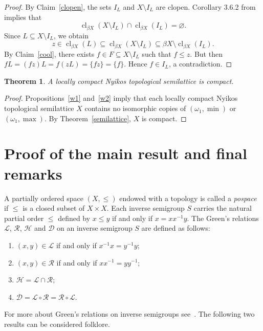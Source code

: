 \documentclass[12pt, twoside, leqno]{article}
\newtheorem{theorem}{Theorem}[section]
\theoremstyle{definition}
\numberwithin{equation}{section}
\newcommand{\w}{\omega}
\newcommand{\cl}{\operatorname{cl}}
\begin{document}
\begin{proof}
 
By Claim~\ref{clopen}, the sets $I_L$ and $X\setminus I_L$ are clopen. Corollary 3.6.2 from \cite{Eng} implies that $$\cl_{\beta X}(X\setminus I_L)\cap \cl_{\beta X}(I_L)=\varnothing.$$
Since $L\subseteq X\setminus I_L$, we obtain $$z\in \cl_{\beta X}(L)\subseteq  \cl_{\beta X}(X\setminus I_L)\subseteq \beta X\setminus \cl_{\beta X}(I_L).$$    
By Claim~\ref{cool}, there exists $f\in F\subseteq X\setminus I_L$ such that $f\leq z$. But then $fL=(fz)L=f(zL)=\{fz\}=\{f\}$. Hence $f\in I_L$, a contradiction. 
\end{proof}






\begin{theorem}\label{Nyikossemilattice}
A locally compact Nyikos topological semilattice is compact.    
\end{theorem}

\begin{proof}
Propositions~\ref{w1} and~\ref{w2} imply that each locally compact Nyikos topological semilattice $X$ contains no isomorphic copies of $(\w_1,\min)$ or $(\omega_1,\max)$. By Theorem~\ref{semilattice}, $X$ is compact.   
\end{proof}

\section{Proof of the main result and final remarks}\label{proof of the main result}


A partially ordered space $(X,\leq)$ endowed with a topology is called a {\em pospace} if $\leq$ is a closed subset of $X{\times}X$.
Each inverse semigroup $S$ carries the natural partial order $\leq$ defined by $x\leq y$ if and only if $x=xx^{-1}y$. 
 The Green's relations $\mathcal L$, $\mathcal R$, $\mathcal H$ and $\mathcal D$ on an inverse semigroup $S$ are defined as follows:

\begin{enumerate}[label=(\roman*)]
    \item $(x,y)\in\mathcal L$ if and only if $x^{-1}x=y^{-1}y$;
    \item $(x,y)\in\mathcal R$ if and only if $xx^{-1}=yy^{-1}$;
    \item $\mathcal H=\mathcal L\cap\mathcal R$;
    \item $\mathcal D=\mathcal L\circ\mathcal R=\mathcal R\circ\mathcal L$.
\end{enumerate}
For more about Green's relations on inverse semigroups see~\cite[Chapter 3.2]{Lawson}.
The following two results can be considered folklore.
\end{document}

